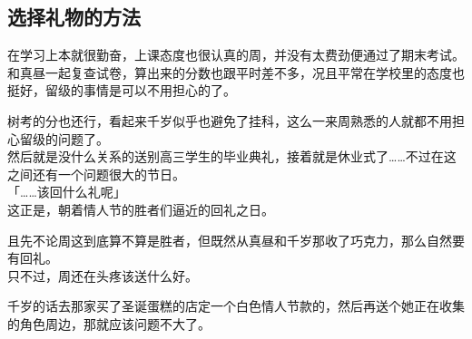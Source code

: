 \subsection{选择礼物的方法}

在学习上本就很勤奋，上课态度也很认真的周，并没有太费劲便通过了期末考试。\\

和真昼一起复查试卷，算出来的分数也跟平时差不多，况且平常在学校里的态度也挺好，留级的事情是可以不用担心的了。

树考的分也还行，看起来千岁似乎也避免了挂科，这么一来周熟悉的人就都不用担心留级的问题了。\\

然后就是没什么关系的送别高三学生的毕业典礼，接着就是休业式了……不过在这之间还有一个问题很大的节日。\\

「……该回什么礼呢」\\

这正是，朝着情人节的胜者们逼近的回礼之日。

且先不论周这到底算不算是胜者，但既然从真昼和千岁那收了巧克力，那么自然要有回礼。\\

只不过，周还在头疼该送什么好。

千岁的话去那家买了圣诞蛋糕的店定一个白色情人节款的，然后再送个她正在收集的角色周边，那就应该问题不大了。\\

